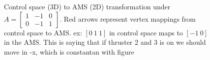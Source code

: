 \begin{figure}
    
    \caption{Control space (3D) to AMS (2D) transformation under $A = \begin{bmatrix}
        1 & -1 & 0 \\ 0 & -1 & 1
    \end{bmatrix}$. Red arrows represent vertex mappings from control space to AMS. ex: $[0\ 1\ 1]$ in control space maps to $[-1\ 0]$ in the AMS. This is saying that if thruster 2 and 3 is on we should move in -x, which is constantan with figure}
    \label{fig:simpleTransform}
    
\end{figure} 